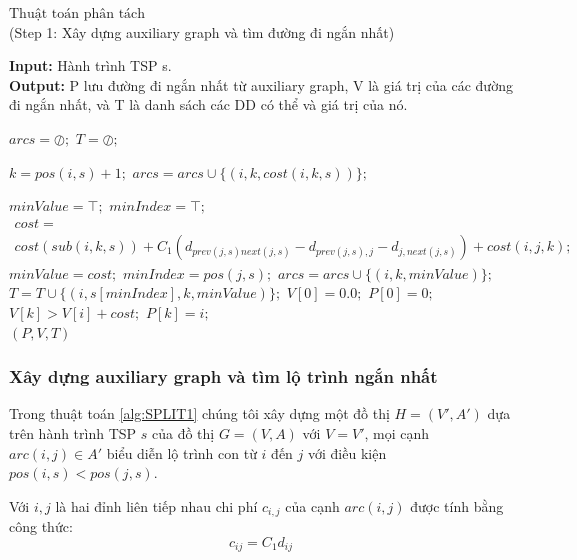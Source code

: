 \documentclass[a4paper,12pt]{report}
\begin{document}
\begin{algorithm}[H]
\caption{$\text{Thuật toán phân tách}$ \\ (Step 1: Xây dựng auxiliary graph và tìm đường đi ngắn nhất)}
\textbf{Input:} Hành trình TSP s.\\
\textbf{Output:} P lưu đường đi ngắn nhất từ auxiliary graph, V là giá trị của các đường đi ngắn nhất, và T là danh sách các DD có thể và giá trị của nó.
\begin{algorithmic}[1]
\State $arcs=\oslash;$
\State $T=\oslash;$

\State $k=pos(i,s)+1;$
\State $arcs=arcs \cup \{(i,k,cost(i,k,s))\}; $
\EndFor
{}

\State $minValue=\top;$
\State $minIndex=\top;$
\State $\begin{array}{l}cost = \\ cost(sub(i,k,s))+C_1(d_{prev(j,s)next(j,s)}-d_{prev(j,s),j}-d_{j,next(j,s)})+cost(i,j,k); \end{array}$
\State $minValue=cost;$
\State $minIndex=pos(j,s);$
\EndIf
\EndIf
\EndFor
\State $arcs=arcs \cup \{(i,k,minValue)\};$
\State $T=T\cup\{(i,s[minIndex],k,minValue)\};$
\EndIf
\EndFor
\EndFor
\State $V[0]=0.0;$
\State $P[0]=0;$
\State $V[k]>V[i]+cost;$
\State $P[k]=i;$
\EndIf
\EndFor
\EndFor\\
\Return $(P,V,T)$
\end{algorithmic}
\label{alg:SPLIT1}
\end{algorithm}
\subsubsection{Xây dựng auxiliary graph và tìm lộ trình ngắn nhất}
Trong thuật toán \ref{alg:SPLIT1} chúng tôi xây dựng một đồ thị $H=(V',A')$ dựa trên hành trình TSP $s$ của đồ thị $G=(V,A)$ với $V=V'$, mọi cạnh $arc(i,j) \in A'$ biểu diễn lộ trình con từ $i$ đến $j$ với điều kiện $pos(i,s)<pos(j,s)$.

Với $i,j$ là hai đỉnh liên tiếp nhau chi phí $c_{i,j}$ của cạnh $arc(i,j)$ được tính bằng công thức:
$$c_{ij}=C_1d_{ij}$$ 
\end{document}
